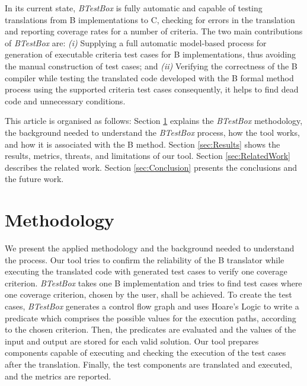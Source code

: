 \documentclass[runningheads]{llncs}
\begin{document}
In its current state,  \textit{BTestBox} is fully automatic and capable of testing translations from B implementations to C, checking for errors in the translation and reporting coverage rates for a number of criteria. 
The two main contributions of  \textit{BTestBox} are: 
\textit{(i)} Supplying a full automatic model-based process for generation of executable criteria test cases for B implementations, thus avoiding the manual  construction of test cases; and
\textit{(ii)} Verifying the correctness of the B compiler while testing the translated code developed with the B formal method process using the supported criteria test cases consequently, it helps to find dead code and unnecessary conditions.

This article is organised as follows: 
Section \ref{sec:BTestBox} explains the  \textit{BTestBox} methodology, the background needed to understand the  \textit{BTestBox} process, how the tool works, and how it is associated with the B method. 
Section \ref{sec:Results} shows the results, metrics, threats, and limitations of our tool. 
Section \ref{sec:RelatedWork} describes the related work. 
Section \ref{sec:Conclusion} presents the conclusions and the future work.

\section{Methodology} \label{sec:BTestBox}

We present the applied methodology and the background needed to understand the process. 
Our tool tries to confirm the reliability of the B translator while executing the translated code with generated test cases to verify one coverage criterion.
\textit{BTestBox} takes one B implementation and tries to find test cases where one coverage criterion, chosen by the user, shall be achieved. 
To create the test cases, \textit{BTestBox} generates a control flow graph and uses Hoare's Logic to write a predicate which comprises the possible values for the execution paths, according to the chosen criterion. 
Then, the predicates are evaluated and the values of the input and output are stored for each valid solution. 
Our tool prepares components capable of executing and checking the execution of the test cases after the translation. Finally, the test components are translated and executed, and the metrics are reported.
\end{document}
